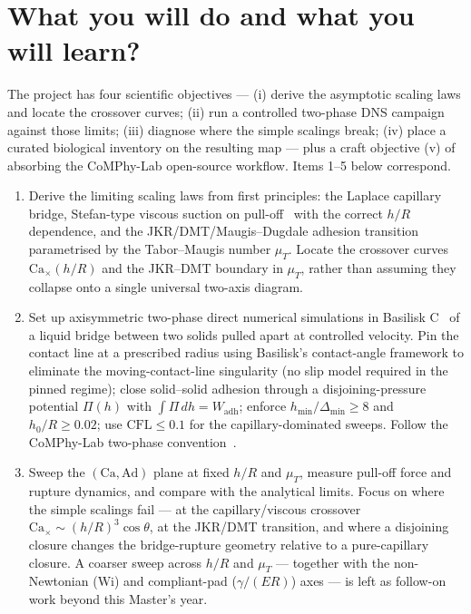 \documentclass[11pt]{article}
\begin{document}
\section*{What you will do and what you will learn?}

The project has four scientific objectives --- (i) derive the asymptotic scaling laws and locate the crossover curves; (ii) run a controlled two-phase DNS campaign against those limits; (iii) diagnose where the simple scalings break; (iv) place a curated biological inventory on the resulting map --- plus a craft objective (v) of absorbing the CoMPhy-Lab open-source workflow. Items 1--5 below correspond.

\begin{enumerate}
\itemsep0em
\item Derive the limiting scaling laws from first principles: the Laplace capillary bridge, Stefan-type viscous suction on pull-off~\citep{stefan1874} with the correct $h/R$ dependence, and the JKR/DMT/Maugis--Dugdale adhesion transition~\citep{maugis1992adhesion} parametrised by the Tabor--Maugis number $\mu_T$. Locate the crossover curves $\mathrm{Ca}_\times(h/R)$ and the JKR--DMT boundary in $\mu_T$, rather than assuming they collapse onto a single universal two-axis diagram.
\item Set up axisymmetric two-phase direct numerical simulations in Basilisk C~\citep{popinet2015quadtree} of a liquid bridge between two solids pulled apart at controlled velocity. Pin the contact line at a prescribed radius using Basilisk's contact-angle framework to eliminate the moving-contact-line singularity (no slip model required in the pinned regime); close solid--solid adhesion through a disjoining-pressure potential $\Pi(h)$ with $\int \Pi\,dh = W_{\mathrm{adh}}$; enforce $h_{\mathrm{min}}/\Delta_{\mathrm{min}} \geq 8$ and $h_0/R \geq 0.02$; use $\mathrm{CFL} \leq 0.1$ for the capillary-dominated sweeps. Follow the CoMPhy-Lab two-phase convention~\citep{basiliskVatsal}.
\item Sweep the $(\mathrm{Ca}, \mathrm{Ad})$ plane at fixed $h/R$ and $\mu_T$, measure pull-off force and rupture dynamics, and compare with the analytical limits. Focus on where the simple scalings fail --- at the capillary/viscous crossover $\mathrm{Ca}_\times \sim (h/R)^3 \cos\theta$, at the JKR/DMT transition, and where a disjoining closure changes the bridge-rupture geometry relative to a pure-capillary closure. A coarser sweep across $h/R$ and $\mu_T$ --- together with the non-Newtonian ($\mathrm{Wi}$) and compliant-pad ($\gamma/(ER)$) axes --- is left as follow-on work beyond this Master's year.

\end{enumerate}
\end{document}
